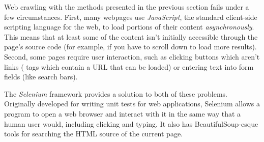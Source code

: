 Web crawling with the methods presented in the previous section fails under a few circumstances.
First, many webpages use \emph{JavaScript}, the standard client-side scripting language for the web, to load portions of their content  \emph{asynchronously}.
This means that at least some of the content isn't initially accessible through the page's source code (for example, if you have to scroll down to load more results).
Second, some pages require user interaction, such as clicking buttons which aren't links ( tags which contain a URL that can be loaded) or entering text into form fields (like search bars).

\begin{comment} %
Navigate to the website \url{http://www.simplesoccerstats.com/stats/teamstats.php?lge=14&type=goals&season=0}.
Notice that there is a row for the Chicago team displayed in the browser.
Open up the page source,
Hit \li{ctrl+f} and search for ``Chicago''.
Notice that it isn't there.
The following code will produce a similar result:

\begin{lstlisting}
>>> soccer_url = 'http://www.simplesoccerstats.com/stats/teamstats.php?lge=14&type=goals&season=0'
>>> soccer_content = requests.get(soccer_url).text
>>> soccer_soup = BeautifulSoup(soccer_content)

>>> print(soccer_soup.find(string='Chicago'))
<<None>>
\end{lstlisting}
Still nothing.
This means the actual table of information is loaded asynchronously.
\end{comment}

The \emph{Selenium} framework provides a solution to both of these problems.
Originally developed for writing unit tests for web applications, Selenium allows a program to open a web browser and interact with it in the same way that a human user would, including clicking and typing.
It also has BeautifulSoup-esque tools for searching the HTML source of the current page.


